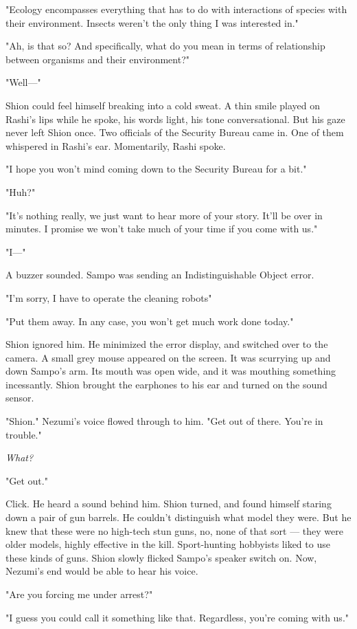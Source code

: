 "Ecology encompasses everything that has to do with interactions of
species with their environment. Insects weren't the only thing I was
interested in."

"Ah, is that so? And specifically, what do you mean in terms of
relationship between organisms and their environment?"

"Well---"

Shion could feel himself breaking into a cold sweat. A thin smile played
on Rashi's lips while he spoke, his words light, his tone
conversational. But his gaze never left Shion once. Two officials of the
Security Bureau came in. One of them whispered in Rashi's ear.
Momentarily, Rashi spoke.

"I hope you won't mind coming down to the Security Bureau for a bit."

"Huh?"

"It's nothing really, we just want to hear more of your story. It'll be
over in minutes. I promise we won't take much of your time if you come
with us."

"I---"

A buzzer sounded. Sampo was sending an Indistinguishable Object error.

"I'm sorry, I have to operate the cleaning robots\el "

"Put them away. In any case, you won't get much work done today."

Shion ignored him. He minimized the error display, and switched over to
the camera. A small grey mouse appeared on the screen. It was scurrying
up and down Sampo's arm. Its mouth was open wide, and it was mouthing
something incessantly. Shion brought the earphones to his ear and turned
on the sound sensor.

"Shion." Nezumi's voice flowed through to him. "Get out of there. You're
in trouble."

\emph{What?}

"Get out."

Click. He heard a sound behind him. Shion turned, and found himself
staring down a pair of gun barrels. He couldn't distinguish what model
they were. But he knew that these were no high-tech stun guns, no, none
of that sort --- they were older models, highly effective in the kill.
Sport-hunting hobbyists liked to use these kinds of guns. Shion slowly
flicked Sampo's speaker switch on. Now, Nezumi's end would be able to
hear his voice.

"Are you forcing me under arrest?"

"I guess you could call it something like that. Regardless, you're
coming with us."

